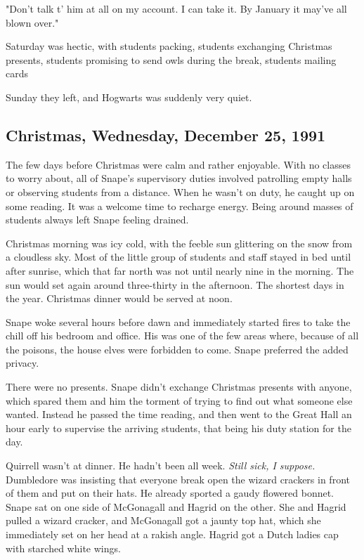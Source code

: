 "Don't talk t' him at all on my account. I can take it. By January it may've all blown over."

Saturday was hectic, with students packing, students exchanging Christmas presents, students promising to send owls during the break, students mailing cards{\el}

Sunday they left, and Hogwarts was suddenly very quiet.

\subsection{Christmas, Wednesday, December 25, 1991}

The few days before Christmas were calm and rather enjoyable. With no classes to worry about, all of Snape's supervisory duties involved patrolling empty halls or observing students from a distance. When he wasn't on duty, he caught up on some reading. It was a welcome time to recharge energy. Being around masses of students always left Snape feeling drained.

Christmas morning was icy cold, with the feeble sun glittering on the snow from a cloudless sky. Most of the little group of students and staff stayed in bed until after sunrise, which that far north was not until nearly nine in the morning. The sun would set again around three-thirty in the afternoon. The shortest days in the year. Christmas dinner would be served at noon.

Snape woke several hours before dawn and immediately started fires to take the chill off his bedroom and office. His was one of the few areas where, because of all the poisons, the house elves were forbidden to come. Snape preferred the added privacy.

There were no presents. Snape didn't exchange Christmas presents with anyone, which spared them and him the torment of trying to find out what someone else wanted. Instead he passed the time reading, and then went to the Great Hall an hour early to supervise the arriving students, that being his duty station for the day.

Quirrell wasn't at dinner. He hadn't been all week. \emph{Still sick, I suppose.} Dumbledore was insisting that everyone break open the wizard crackers in front of them and put on their hats. He already sported a gaudy flowered bonnet. Snape sat on one side of McGonagall and Hagrid on the other. She and Hagrid pulled a wizard cracker, and McGonagall got a jaunty top hat, which she immediately set on her head at a rakish angle. Hagrid got a Dutch ladies cap with starched white wings.

